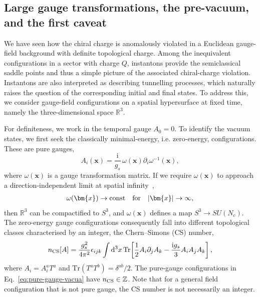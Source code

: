 \documentclass[review]{elsarticle}
\numberwithin{equation}{section}
\numberwithin{table}{section}
\numberwithin{figure}{section}
\def\d{\mathrm{d}}
\def\vec{\bm}
\def\i{\mathrm{i}}
\def\vecx{\vec{x}}
\def\tr{\mathrm{Tr}}
\begin{document}
\subsection{Large gauge transformations, the pre-vacuum, and the first caveat}
\label{sec:pre-vacuum}

We have seen how the chiral charge is anomalously violated in a Euclidean gauge-field background with definite topological charge. Among the inequivalent configurations in a sector with charge $Q$, instantons provide the semiclassical saddle points and thus a simple picture of the associated chiral-charge violation. Instantons are also interpreted as describing tunnelling processes, which naturally raises the question of the corresponding initial and final states. To address this, we consider gauge-field configurations on a spatial hypersurface at fixed time, namely the three-dimensional space $\mathbb{R}^3$.

For definiteness, we work in the temporal gauge $A_0=0$. To identify the vacuum states, we first seek the classically minimal-energy, i.e. zero-energy, configurations. These are pure gauges,
\begin{equation}
    A_i(\vecx) = \frac{\i}{g_s}\,\omega(\vecx)\partial_i\omega^{-1}(\vecx),
    \label{eq:pure-gauge-vacua}
\end{equation}
where $\omega(\vecx)$ is a gauge transformation matrix. If we require $\omega(\vecx)$ to approach a direction-independent limit at spatial infinity~\cite{Callan:1976je},
\begin{align}
    \omega(\vecx)\to {\rm const} \quad \text{for} \quad |\vecx|\to\infty,
    \label{eq:constant-assumption}
\end{align}
then $\mathbb{R}^3$ can be compactified to $S^3$, and $\omega(\vecx)$ defines a map $S^3\to SU(N_c)$. The zero-energy gauge configurations consequently fall into different topological classes characterised by an integer, the Chern--Simons (CS) number,
\begin{equation}
    n_{\rm CS}[A] = \frac{g_s^2}{4\pi^2} \epsilon_{ijk}\int \d^3x\,\tr\!\left[\frac{1}{2}A_i\partial_j A_k - \frac{\i g_s}{3}A_iA_jA_k\right],
    \label{eq:winding-number-large-gauge}
\end{equation}
where $A_i=A_i^aT^a$ and $\tr(T^aT^b)=\delta^{ab}/2$. The pure-gauge configurations in Eq.~\eqref{eq:pure-gauge-vacua} have $n_{\rm CS}\in\mathbb{Z}$. Note that for a general field configuration that is not pure gauge, the CS number is not necessarily an integer.
\end{document}
